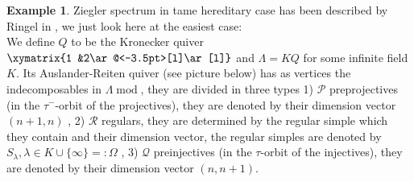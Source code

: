 \documentclass[11pt,a4paper]{amsart}
\theoremstyle{plain}
\theoremstyle{definition}
\newtheorem{exa}[thm]{Example}
\DeclareMathOperator{\modu}{mod}
\newcommand{\La}{\Lambda}
\newcommand{\mcP}{\mathcal{P}}
\newcommand{\mcQ}{\mathcal{Q}}
\newcommand{\mcR}{\mathcal{R}}
\begin{document}
\begin{exa} Ziegler spectrum in tame hereditary case has been described by Ringel in \cite{Ri-Ziegler}, we just look here at the easiest case: \\
We define $Q$ to be the Kronecker quiver $\xymatrix{1 &2\ar@<-3.5pt>[l]\ar[l]}$ and $\La=KQ$ for some infinite field $K$. Its Auslander-Reiten quiver (see picture below) has as vertices the indecomposables in $\La\modu$, they are divided in three types 1) $\mcP$ preprojectives (in the $\tau^-$-orbit of the projectives), they are denoted by their dimension vector $(n+1,n)$ , 2) $\mcR$ regulars, they are determined by the regular simple which they contain and their dimension vector, the regular simples are denoted by $S_{\lambda}, \lambda \in K\cup \{\infty\}=:\Omega$ , 3) $\mcQ$ preinjectives (in the $\tau$-orbit of the injectives), they are denoted by their dimension vector $(n,n+1)$. 


\end{exa}
\end{document}
